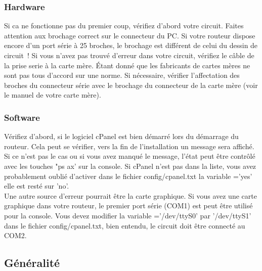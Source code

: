 \subsubsection{Hardware}

Si ca ne fonctionne pas du premier coup, vérifiez d'abord votre circuit. Faites
attention aux brochage correct sur le connecteur du PC. Si votre routeur dispose
encore d'un port série à 25 broches, le brochage est différent de celui du
dessin de circuit~! Si vous n'avez pas trouvé d'erreur dans votre circuit,
vérifiez le câble de la prise serie à la carte mère. Étant donné que les
fabricants de cartes mères ne sont pas tous d'accord sur une norme. Si
nécessaire, vérifier l'affectation des broches du connecteur série avec le
brochage du connecteur de la carte mère (voir le manuel de votre carte mère).

\subsubsection{Software}

Vérifiez d'abord, si le logiciel cPanel est bien démarré lors du démarrage du
routeur. Cela peut se vérifier, vers la fin de l'installation un message sera
affiché. Si ce n'est pas le cas ou si vous avez manqué le message, l'état peut
être contrôlé avec les touches "ps ax' sur la console. Si cPanel n'est pas dans
la liste, vous avez probablement oublié d'activer dans le fichier config/cpanel.txt
la variable ='yes' elle est resté sur 'no'.\\
Une autre source d'erreur pourrait être la carte graphique. Si vous avez une
carte graphique dans votre routeur, le premier port série (COM1) est peut être
utilisé pour la console. Vous devez modifier la variable ='/dev/ttyS0'
par '/dev/ttyS1' dans le fichier config/cpanel.txt, bien entendu, le circuit doit
être connecté au COM2.

\subsection{Généralité}

